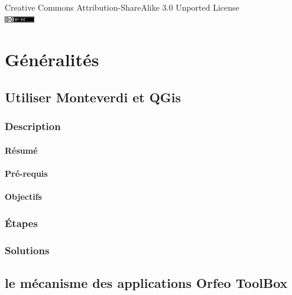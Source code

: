 \documentclass[a4paper,11pt,twoside,openright]{article}
\begin{document}
\newpage

\begin{center}
\vspace*{10cm}
\tiny Creative Commons Attribution-ShareAlike 3.0 Unported License\\
\normalsize
\includegraphics[width=0.1\textwidth]{Images/CC-licence.png}
\end{center}
\newpage

\section{Généralités}
\label{sec-2}
\subsection{Utiliser \textbf{Monteverdi} et \textbf{QGis}}
\label{sec-2-1}
\subsubsection{Description}
\label{sec-2-1-1}
\paragraph{Résumé}
\label{sec-2-1-1-1}

\paragraph{Pré-requis}
\label{sec-2-1-1-2}


\paragraph{Objectifs}
\label{sec-2-1-1-3}

\subsubsection{Étapes}
\label{sec-2-1-2}

\subsubsection{Solutions}
\label{sec-2-1-3}
\subsection{le mécanisme des applications \textbf{Orfeo ToolBox}}
\label{sec-2-2}
\end{document}
